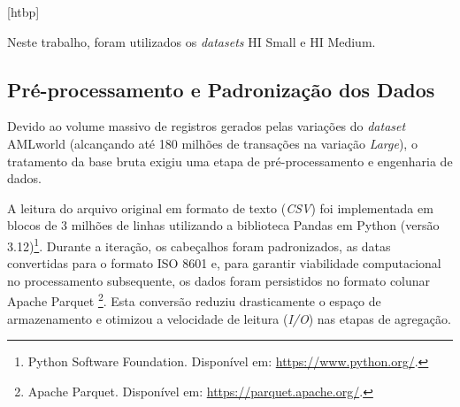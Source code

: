 \documentclass[a4paper,12pt,oneside,onecolumn,final,fleqn]{repUERJ}
\makeatletter
\renewenvironment{table}[1][htbp]
  {\@float{table}[#1]\centering}
  {\end@float}
\makeatother
\begin{document}
\begin{table}
    \centering
    \caption{Resumo das variações do \textit{dataset} AMLworld}
    \label{tab:amlworld-datasets}
\end{table}

Neste trabalho, foram utilizados os \textit{datasets} HI Small e HI Medium.

\subsection{Pré-processamento e Padronização dos Dados}

Devido ao volume massivo de registros gerados pelas variações do \textit{dataset} AMLworld (alcançando até 180 milhões de transações na variação \textit{Large}), o tratamento da base bruta exigiu uma etapa de pré-processamento e engenharia de dados.

A leitura do arquivo original em formato de texto (\textit{CSV}) foi implementada em blocos de 3 milhões de linhas utilizando a biblioteca Pandas em Python (versão 3.12)\footnote{Python Software Foundation. Disponível em: \url{https://www.python.org/}.}. Durante a iteração, os cabeçalhos foram padronizados, as datas convertidas para o formato ISO 8601 e, para garantir viabilidade computacional no processamento subsequente, os dados foram persistidos no formato colunar Apache Parquet \footnote{Apache Parquet. Disponível em: \url{https://parquet.apache.org/}.}. Esta conversão reduziu drasticamente o espaço de armazenamento e otimizou a velocidade de leitura (\textit{I/O}) nas etapas de agregação.
\end{document}
